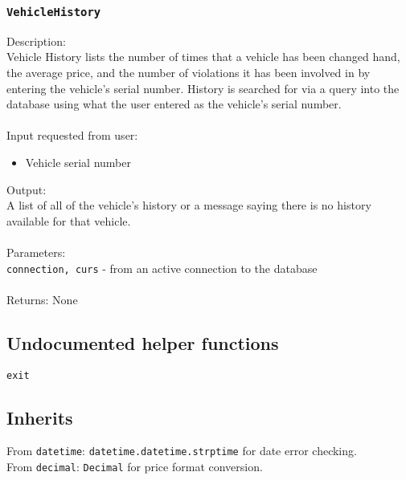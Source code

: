\documentclass[12pt]{article}
\begin{document}
\subsubsection{\texttt{VehicleHistory}}
Description:\\
\indent Vehicle History lists the number of times that a vehicle has been changed
    hand, the average price, and the number of violations it has been involved
    in by entering the vehicle's serial number. History is searched for via a query into the database using what the user 
    entered as the vehicle's serial number. \\\\
Input requested from user:
\begin{itemize}
\item Vehicle serial number
\end{itemize}
Output:\\
\indent A list of all of the vehicle's history or a message saying there 
            is no history available for that vehicle.\\\\
Parameters:\\
\indent\texttt{connection, curs} - from an active connection to the database\\\\
Returns: None

\subsection{Undocumented helper functions}
\texttt{exit}

\subsection{Inherits}
From \texttt{datetime}: \texttt{datetime.datetime.strptime} for date error checking.\\
From \texttt{decimal}: \texttt{Decimal} for price format conversion.
\end{document}
